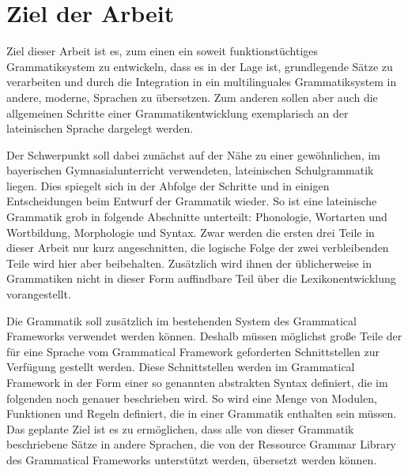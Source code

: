 \section{Ziel der Arbeit}
\label{sec:ziel}
Ziel dieser Arbeit ist es, zum einen ein soweit funktionstüchtiges Grammatiksystem zu entwickeln, dass es in der Lage ist, grundlegende Sätze zu verarbeiten und durch die Integration in ein multilinguales Grammatiksystem in andere, moderne, Sprachen zu übersetzen. Zum anderen sollen aber auch die allgemeinen Schritte einer Grammatikentwicklung exemplarisch an der lateinischen Sprache dargelegt werden. \par
Der Schwerpunkt soll dabei zunächst auf der Nähe zu einer gewöhnlichen, im bayerischen Gymnasialunterricht verwendeten, lateinischen Schulgrammatik liegen. Dies spiegelt sich in der Abfolge der Schritte und in einigen Entscheidungen beim Entwurf der Grammatik wieder. So ist eine lateinische Grammatik grob in folgende Abschnitte unterteilt: Phonologie, Wortarten und Wortbildung, Morphologie und Syntax. Zwar werden die ersten drei Teile in dieser Arbeit nur kurz angeschnitten, die logische Folge der zwei verbleibenden Teile wird hier aber beibehalten. Zusätzlich wird ihnen der üblicherweise in Grammatiken nicht in dieser Form auffindbare Teil über die Lexikonentwicklung vorangestellt. \par
Die Grammatik soll zusätzlich im bestehenden System des Grammatical Frameworks verwendet werden können. Deshalb müssen möglichst große Teile der für eine Sprache vom Grammatical Framework geforderten Schnittstellen zur Verfügung gestellt werden. Diese Schnittstellen werden im Grammatical Framework in der Form einer so genannten abstrakten Syntax definiert, die im folgenden noch genauer beschrieben wird. So wird eine Menge von Modulen, Funktionen und Regeln definiert, die in einer Grammatik enthalten sein müssen. Das geplante Ziel ist es zu ermöglichen, dass alle von dieser Grammatik beschriebene Sätze in andere Sprachen, die von der Ressource Grammar Library des Grammatical Frameworks unterstützt werden, übersetzt werden können.
\pagebreak
